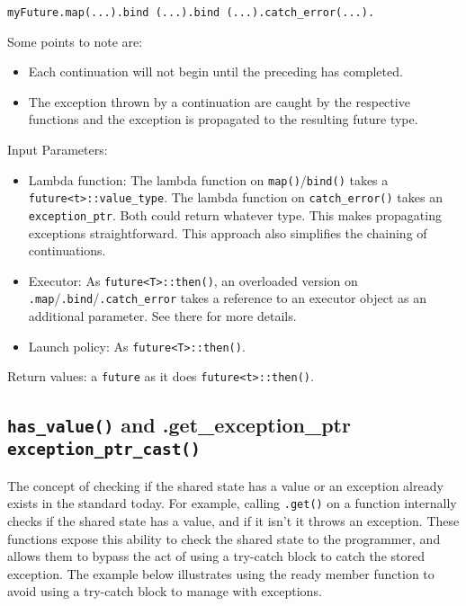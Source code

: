 \documentclass[a4paper,10pt]{article}
\newcommand{\cpp}[1]{\lstinline{#1}}
\newcommand{\suppress}[1]{\colorbox{suppress_color}{#1}}
\newcommand{\update}[1]{\colorbox{update_color}{#1}}
\begin{document}
\begin{lstlisting}[xleftmargin=0pt]
myFuture.map(...).bind (...).bind (...).catch_error(...). 
\end{lstlisting}

Some points to note are: 

\begin{itemize}
\item Each continuation will not begin until the preceding has completed.
\item The exception thrown by a continuation are caught by the respective functions and the exception is propagated to the resulting future type. 
\end{itemize}

Input Parameters: 

\begin{itemize}
\item Lambda function: The lambda function on \cpp{map()}/\cpp{bind()} takes a 
\cpp{future<t>::value_type}. The lambda function on \cpp{catch_error()} takes an \cpp{exception_ptr}. Both could return whatever type. This makes propagating exceptions straightforward. This approach also simplifies the chaining of continuations.
 
\item Executor: As \cpp{future<T>::then()}, an overloaded version on \cpp{.map}/\cpp{.bind}/\cpp{.catch_error} takes a reference to an executor object as an additional parameter. See there for more details.

\item Launch policy: As \cpp{future<T>::then()}. 
\end{itemize}

Return values: a \cpp{future} as it does \cpp{future<t>::then()}.

\subsection{\cpp{has_value()}  and  \suppress{.get_exception_ptr}\update{ \cpp{exception_ptr_cast()}}}

The concept of checking if the shared state has a value or an exception already exists in the standard today. For example, calling 
\cpp{.get()} on a function internally checks if the shared state has a value, and if it isn't it throws an exception. These functions expose this ability to check the shared state to the programmer, and allows them to bypass the act of using a try-catch block to catch the stored exception. The example below illustrates using the ready member function to avoid using a try-catch block to manage with exceptions.
\end{document}
